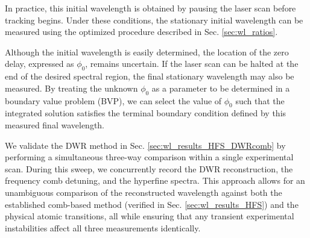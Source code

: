 \documentclass[8pt,a4paper]{report}
\begin{document}
	In practice, this initial wavelength is obtained by pausing the laser scan before tracking begins. Under these conditions, the stationary initial wavelength can be measured using the optimized procedure described in Sec. \ref{sec:wl_ratios}.
	
	Although the initial wavelength is easily determined, the location of the zero delay, expressed as $\phi_0$, remains uncertain. If the laser scan can be halted at the end of the desired spectral region, the final stationary wavelength may also be measured. By treating the unknown $\phi_0$ as a parameter to be determined in a boundary value problem (BVP), we can select the value of $\phi_0$ such that the integrated solution satisfies the terminal boundary condition defined by this measured final wavelength.
	
	We validate the DWR method in Sec. \ref{sec:wl_results_HFS_DWRcomb} by performing a simultaneous three-way comparison within a single experimental scan. During this sweep, we concurrently record the DWR reconstruction, the frequency comb detuning, and the hyperfine spectra. This approach allows for an unambiguous comparison of the reconstructed wavelength against both the established comb-based method (verified in Sec. \ref{sec:wl_results_HFS}) and the physical atomic transitions, all while ensuring that any transient experimental instabilities affect all three measurements identically.
	
\end{document}
